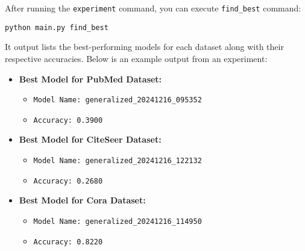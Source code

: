 {	After running the \texttt{experiment} command, you can execute \texttt{find\_best} command:
	\begin{tcolorbox}
		\texttt{python main.py find\_best}
	\end{tcolorbox}
	It output lists the best-performing models for each dataset along with their respective accuracies. Below is an example output from an experiment:
	
	\begin{itemize}
		\item \textbf{Best Model for PubMed Dataset:}
		\begin{itemize}
			\item \texttt{Model Name: generalized\_20241216\_095352}
			\item \texttt{Accuracy: 0.3900}
		\end{itemize}
		\item \textbf{Best Model for CiteSeer Dataset:}
		\begin{itemize}
			\item \texttt{Model Name: generalized\_20241216\_122132}
			\item \texttt{Accuracy: 0.2680}
		\end{itemize}
		\item \textbf{Best Model for Cora Dataset:}
		\begin{itemize}
			\item \texttt{Model Name: generalized\_20241216\_114950}
			\item \texttt{Accuracy: 0.8220}
		\end{itemize}
	\end{itemize}
	}
	
	\newpage
